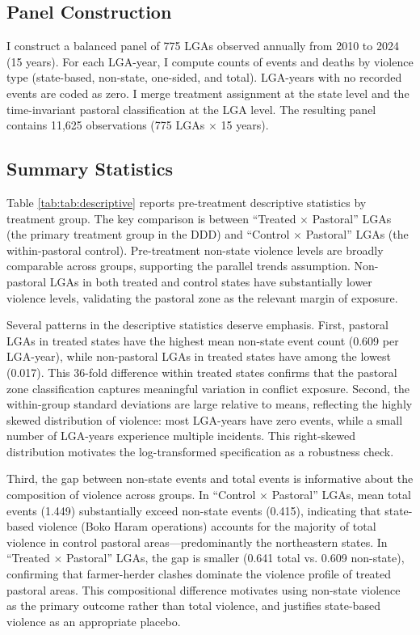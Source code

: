 \documentclass[12pt]{article}
\begin{document}
\subsection{Panel Construction}

I construct a balanced panel of 775 LGAs observed annually from 2010 to 2024 (15 years). For each LGA-year, I compute counts of events and deaths by violence type (state-based, non-state, one-sided, and total). LGA-years with no recorded events are coded as zero. I merge treatment assignment at the state level and the time-invariant pastoral classification at the LGA level. The resulting panel contains 11,625 observations (775 LGAs $\times$ 15 years).

\subsection{Summary Statistics}

Table \ref{tab:tab:descriptive} reports pre-treatment descriptive statistics by treatment group. The key comparison is between ``Treated $\times$ Pastoral'' LGAs (the primary treatment group in the DDD) and ``Control $\times$ Pastoral'' LGAs (the within-pastoral control). Pre-treatment non-state violence levels are broadly comparable across groups, supporting the parallel trends assumption. Non-pastoral LGAs in both treated and control states have substantially lower violence levels, validating the pastoral zone as the relevant margin of exposure.

Several patterns in the descriptive statistics deserve emphasis. First, pastoral LGAs in treated states have the highest mean non-state event count (0.609 per LGA-year), while non-pastoral LGAs in treated states have among the lowest (0.017). This 36-fold difference within treated states confirms that the pastoral zone classification captures meaningful variation in conflict exposure. Second, the within-group standard deviations are large relative to means, reflecting the highly skewed distribution of violence: most LGA-years have zero events, while a small number of LGA-years experience multiple incidents. This right-skewed distribution motivates the log-transformed specification as a robustness check.

Third, the gap between non-state events and total events is informative about the composition of violence across groups. In ``Control $\times$ Pastoral'' LGAs, mean total events (1.449) substantially exceed non-state events (0.415), indicating that state-based violence (Boko Haram operations) accounts for the majority of total violence in control pastoral areas---predominantly the northeastern states. In ``Treated $\times$ Pastoral'' LGAs, the gap is smaller (0.641 total vs. 0.609 non-state), confirming that farmer-herder clashes dominate the violence profile of treated pastoral areas. This compositional difference motivates using non-state violence as the primary outcome rather than total violence, and justifies state-based violence as an appropriate placebo.
\end{document}

